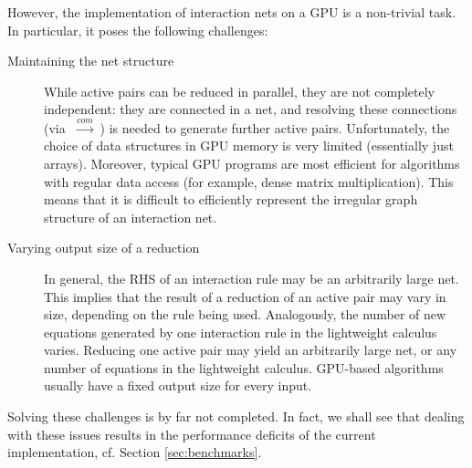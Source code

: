 \documentclass[submission,copyright,creativecommons]{eptcs}
\newcommand{\lwcom}{$\;\stackrel{com}{\longrightarrow}\;$}
\begin{document}
However, the implementation of interaction nets on a GPU is a non-trivial task.
In particular, it poses the following challenges:
\begin{description}
  \item[Maintaining the net structure] While active pairs can be reduced in
  parallel, they are not completely independent: they are connected in a net,
  and resolving these connections (via \lwcom) is needed to generate further
  active pairs. Unfortunately, the choice of data structures in GPU memory is very limited
  (essentially just arrays). Moreover, typical GPU programs are most efficient
  for algorithms with regular data access (for example, dense matrix
  multiplication). This means that it is difficult to efficiently
  represent the irregular graph structure of an interaction net.
  \item[Varying output size of a reduction]
  In general, the RHS of an interaction rule may be an arbitrarily large net.
  This implies that the result of a reduction of an active pair may vary in
  size, depending on the rule being used. Analogously, the number of new
  equations generated by one interaction rule in the lightweight calculus
  varies.
  Reducing one active pair may yield
  an arbitrarily large net, or any number of equations in the lightweight
  calculus.
  GPU-based algorithms usually have a fixed output size for every
  input.
\end{description}
Solving these challenges is by far not completed. In fact, we shall see that
dealing with these issues results in the performance deficits of the current
implementation, cf. Section \ref{sec:benchmarks}.

\end{document}
